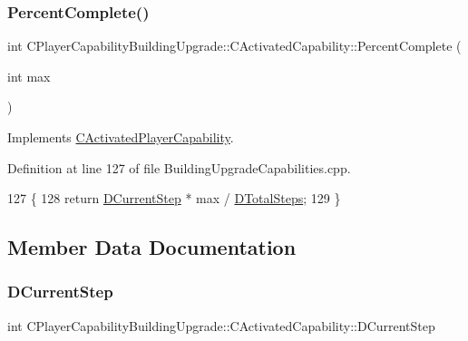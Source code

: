 \subsubsection{\texorpdfstring{Percent\+Complete()}{PercentComplete()}}
{\footnotesize\ttfamily int C\+Player\+Capability\+Building\+Upgrade\+::\+C\+Activated\+Capability\+::\+Percent\+Complete (\begin{DoxyParamCaption}\item[{int}]{max }\end{DoxyParamCaption})\hspace{0.3cm}{\ttfamily [virtual]}}



Implements \hyperlink{classCActivatedPlayerCapability_a405dc6076058006a4f801727de4cfe4d}{C\+Activated\+Player\+Capability}.



Definition at line 127 of file Building\+Upgrade\+Capabilities.\+cpp.


\begin{DoxyCode}
127                                                                                 \{
128     \textcolor{keywordflow}{return} \hyperlink{classCPlayerCapabilityBuildingUpgrade_1_1CActivatedCapability_a70e4e67d8115643f7ffa11dc72fcf63c}{DCurrentStep} * max / \hyperlink{classCPlayerCapabilityBuildingUpgrade_1_1CActivatedCapability_a9c4ea12cf99701f8ce38e17e03ad0115}{DTotalSteps};
129 \}
\end{DoxyCode}


\subsection{Member Data Documentation}
\hypertarget{classCPlayerCapabilityBuildingUpgrade_1_1CActivatedCapability_a70e4e67d8115643f7ffa11dc72fcf63c}{}\label{classCPlayerCapabilityBuildingUpgrade_1_1CActivatedCapability_a70e4e67d8115643f7ffa11dc72fcf63c} 
\subsubsection{\texorpdfstring{D\+Current\+Step}{DCurrentStep}}
{\footnotesize\ttfamily int C\+Player\+Capability\+Building\+Upgrade\+::\+C\+Activated\+Capability\+::\+D\+Current\+Step\hspace{0.3cm}{\ttfamily [protected]}}



